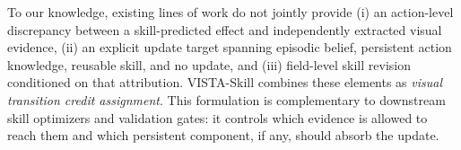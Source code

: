 To our knowledge, existing lines of work do not jointly provide (i) an action-level discrepancy between a skill-predicted effect and independently extracted visual evidence, (ii) an explicit update target spanning episodic belief, persistent action knowledge, reusable skill, and no update, and (iii) field-level skill revision conditioned on that attribution. VISTA-Skill combines these elements as \emph{visual transition credit assignment}. This formulation is complementary to downstream skill optimizers and validation gates: it controls which evidence is allowed to reach them and which persistent component, if any, should absorb the update.
